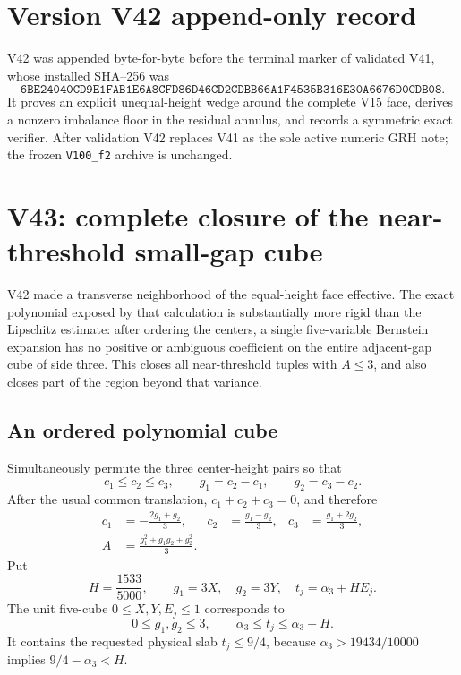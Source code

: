\documentclass[11pt]{article}
\theoremstyle{definition}
\theoremstyle{remark}
\begin{document}
\section*{Version V42 append-only record}

V42 was appended byte-for-byte before the terminal marker of validated
V41, whose installed SHA--256 was
\[
 \texttt{6BE24040CD9E1FAB1E6A8CFD86D46CD2}
 \allowbreak\texttt{CDBB66A1F4535B316E30A6676D0CDB08}.
\tag{N42.15}
\]
It proves an explicit unequal-height wedge around the complete V15 face,
derives a nonzero imbalance floor in the residual annulus, and records a
symmetric exact verifier.  After validation V42 replaces V41 as the sole
active numeric GRH note; the frozen \texttt{V100\_f2} archive is
unchanged.





\section{V43: complete closure of the near-threshold small-gap cube}
\label{sec:f2v43-gap-cube}

V42 made a transverse neighborhood of the equal-height face effective.
The exact polynomial exposed by that calculation is substantially more
rigid than the Lipschitz estimate: after ordering the centers, a single
five-variable Bernstein expansion has no positive or ambiguous
coefficient on the entire adjacent-gap cube of side three.  This closes
all near-threshold tuples with \(A\leq3\), and also closes part of the
region beyond that variance.

\subsection{An ordered polynomial cube}

Simultaneously permute the three center-height pairs so that
\[
 c_1\leq c_2\leq c_3,\qquad
 g_1=c_2-c_1,\qquad g_2=c_3-c_2.
\tag{N43.1}
\]
After the usual common translation, \(c_1+c_2+c_3=0\), and therefore
\[
\begin{aligned}
c_1&=-\frac{2g_1+g_2}{3},&
c_2&=\frac{g_1-g_2}{3},&
c_3&=\frac{g_1+2g_2}{3},\\
A&=\frac{g_1^2+g_1g_2+g_2^2}{3}.
\end{aligned}
\tag{N43.2}
\]
Put
\[
 H=\frac{1533}{5000},\qquad
 g_1=3X,\quad g_2=3Y,\quad
 t_j=\alpha_3+HE_j.
\tag{N43.3}
\]
The unit five-cube \(0\leq X,Y,E_j\leq1\) corresponds to
\[
0\leq g_1,g_2\leq3,\qquad
\alpha_3\leq t_j\leq\alpha_3+H.
\tag{N43.4}
\]
It contains the requested physical slab \(t_j\leq9/4\), because
\(\alpha_3>19434/10000\) implies \(9/4-\alpha_3<H\).
\end{document}
